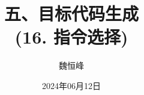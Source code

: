 \documentclass[]{beamer}
\title[目标代码生成]{五、目标代码生成 \\ (16. 指令选择)}
\author[魏恒峰]{\large 魏恒峰}
\institute{hfwei@nju.edu.cn}
\date{2024年06月12日}
\begin{document}
\maketitle




\thankyou{}

\end{document}
